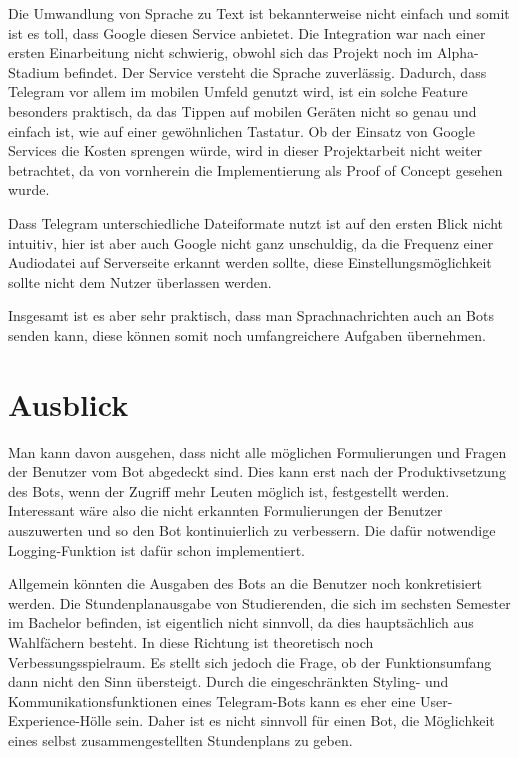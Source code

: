 Die Umwandlung von Sprache zu Text ist bekannterweise nicht einfach und somit ist es toll, dass Google diesen Service anbietet. Die Integration war nach einer ersten Einarbeitung nicht schwierig, obwohl sich das Projekt noch im Alpha-Stadium befindet. Der Service versteht die Sprache zuverlässig.
Dadurch, dass Telegram vor allem im mobilen Umfeld genutzt wird, ist ein solche Feature besonders praktisch, da das Tippen auf mobilen Geräten nicht so genau und einfach ist, wie auf einer gewöhnlichen Tastatur. Ob der Einsatz von Google Services die Kosten sprengen würde, wird in dieser Projektarbeit nicht weiter betrachtet, da von vornherein die Implementierung als Proof of Concept gesehen wurde.

Dass Telegram unterschiedliche Dateiformate nutzt ist auf den ersten Blick nicht intuitiv, hier ist aber auch Google nicht ganz unschuldig, da die Frequenz einer Audiodatei auf Serverseite erkannt werden sollte, diese Einstellungsmöglichkeit sollte nicht dem Nutzer überlassen werden.

Insgesamt ist es aber sehr praktisch, dass man Sprachnachrichten auch an Bots senden kann, diese können somit noch umfangreichere Aufgaben übernehmen.

\section{Ausblick}
Man kann davon ausgehen, dass nicht alle möglichen Formulierungen und Fragen der Benutzer vom Bot abgedeckt sind. Dies kann erst nach der Produktivsetzung des Bots, wenn der Zugriff mehr Leuten möglich ist, festgestellt werden. Interessant wäre also die nicht erkannten Formulierungen der Benutzer auszuwerten und so den Bot kontinuierlich zu verbessern. Die dafür notwendige Logging-Funktion ist dafür schon implementiert.

Allgemein könnten die Ausgaben des Bots an die Benutzer noch konkretisiert werden. Die Stundenplanausgabe von Studierenden, die sich im sechsten Semester im Bachelor befinden, ist eigentlich nicht sinnvoll, da dies hauptsächlich aus Wahlfächern besteht. In diese Richtung ist theoretisch noch Verbessungsspielraum.
Es stellt sich jedoch die Frage, ob der Funktionsumfang dann nicht den Sinn übersteigt. Durch die eingeschränkten Styling- und Kommunikationsfunktionen eines Telegram-Bots kann es eher eine User-Experience-Hölle sein. Daher ist es nicht sinnvoll für einen Bot, die Möglichkeit eines selbst zusammengestellten Stundenplans zu geben.

